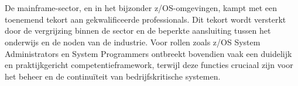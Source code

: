 
%
%
%
%
%

%



\chapter*{}

De mainframe-sector, en in het bijzonder z/OS-omgevingen, kampt met een toenemend tekort aan gekwalificeerde professionals. Dit tekort wordt versterkt door de vergrijzing binnen de sector en de beperkte aansluiting tussen het onderwijs en de noden van de industrie. Voor rollen zoals z/OS System Administrators en System Programmers ontbreekt bovendien vaak een duidelijk en praktijkgericht competentieframework, terwijl deze functies cruciaal zijn voor het beheer en de continuïteit van bedrijfskritische systemen.

